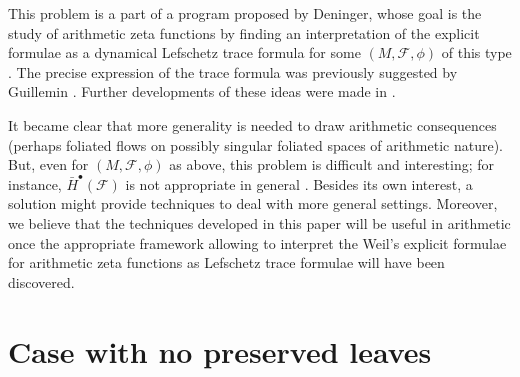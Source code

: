 \documentclass{memo-l}
\theoremstyle{plain}
\theoremstyle{definition}
\theoremstyle{remark}
\newcommand{\FF}{\mathcal{F}}
\numberwithin{section}{chapter}
\numberwithin{equation}{section}%
\begin{document}
This problem is a part of a program proposed by Deninger, whose goal is the study of arithmetic zeta functions by finding an interpretation of the explicit formulae as a dynamical Lefschetz trace formula for some $(M,\FF,\phi)$ of this type \cite{Deninger1998,Deninger2001,Deninger2002,Deninger-Arith_geom_anal_fol_sps,Deninger2008}. The precise expression of the trace formula was previously suggested by Guillemin \cite{Guillemin1977}. Further developments of these ideas were made in \cite{DeningerSinghof2002,Mumken2006,Kopei2006,Leichtnam2008,Kopei2011,Leichtnam2014,KordyukovPavlenko2015,
Kim-fiber_bdls,Deninger-Dyn-Syst-for-arith-schemes,Deninger-Primes-knots-periodic-orbits}.

It became clear that more generality is needed to draw arithmetic consequences (perhaps foliated flows on possibly singular foliated spaces of arithmetic nature). But, even for $(M,\FF,\phi)$ as above, this problem is difficult and interesting; for instance, $\bar H^\bullet(\FF)$ is not appropriate in general \cite{DeningerSinghof2001}. Besides its own interest, a solution might provide techniques to deal with more general settings. Moreover, we believe that 
the techniques developed in this paper will be useful in arithmetic once the appropriate framework 
allowing to interpret the Weil’s explicit formulae for arithmetic zeta functions as Lefschetz trace formulae will have been discovered.


\section{Case with no preserved leaves}\label{s: no preserved leaves}
\end{document}
